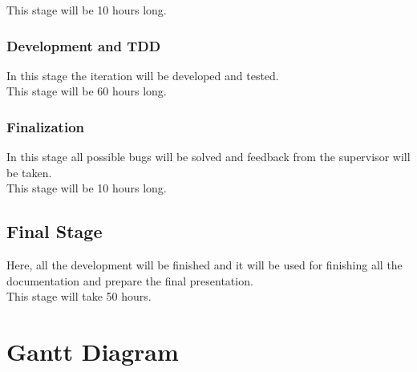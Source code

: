This stage will be 10 hours long.
\subsubsection{Development and TDD}
In this stage the iteration will be developed and tested.\\

This stage will be 60 hours long.
\subsubsection{Finalization}
In this stage all possible bugs will be solved and feedback from the supervisor will be taken.\\

This stage will be 10 hours long.


\subsection{Final Stage}
Here, all the development will be finished and it will be used for finishing all the documentation and prepare the final presentation.\\

This stage will take 50 hours.



\section{Gantt Diagram}

